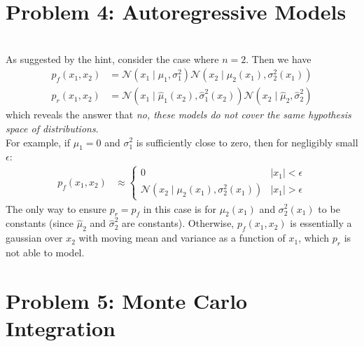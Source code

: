\documentclass[11pt]{article}
\newcommand\p{\noindent}
\begin{document}
\clearpage
\section*{Problem 4: Autoregressive Models}


\\

\p As suggested by the hint, consider the case where $n = 2$. Then we have
\begin{align}
	p_f(x_1, x_2)
		&= \mathcal{N}(x_1 \mid \mu_1, \sigma_1^2) \mathcal{N}(x_2 \mid \mu_2(x_1), \sigma_2^2(x_1)) \\
	p_r(x_1, x_2)
		&= \mathcal{N}(x_1 \mid \hat \mu_1 (x_2),  \hat \sigma_1^2(x_2))
		 	  \mathcal{N}(x_2 \mid \hat \mu_2, \hat \sigma_2^2) 
\end{align}
which reveals the answer that \textit{no, these models do not cover the same hypothesis space of distributions}. \\

\p For example, if $\mu_1 = 0$ and $\sigma_1^2$ is sufficiently close to zero, then for negligibly small $\epsilon$:
\begin{align}
 	p_f(x_1, x_2) 
 		&\approx 
 	\begin{cases}
 		0 & |x_1| < \epsilon \\
 		\mathcal N(x_2 \mid \mu_2(x_1), \sigma_2^2(x_1)) & |x_1| > \epsilon 
 	\end{cases} 
\end{align}
The only way to ensure $p_r = p_f$ in this case is for $\mu_2(x_1)$ and $\sigma_2^2(x_1)$ to be constants (since $\hat \mu_2$ and $\hat \sigma_2^2$ are constants). Otherwise, $p_f(x_1, x_2)$ is essentially a gaussian over $x_2$ with moving mean and variance as a function of $x_1$, which $p_r$ is not able to model.






\clearpage
\section*{Problem 5: Monte Carlo Integration}
\end{document}
